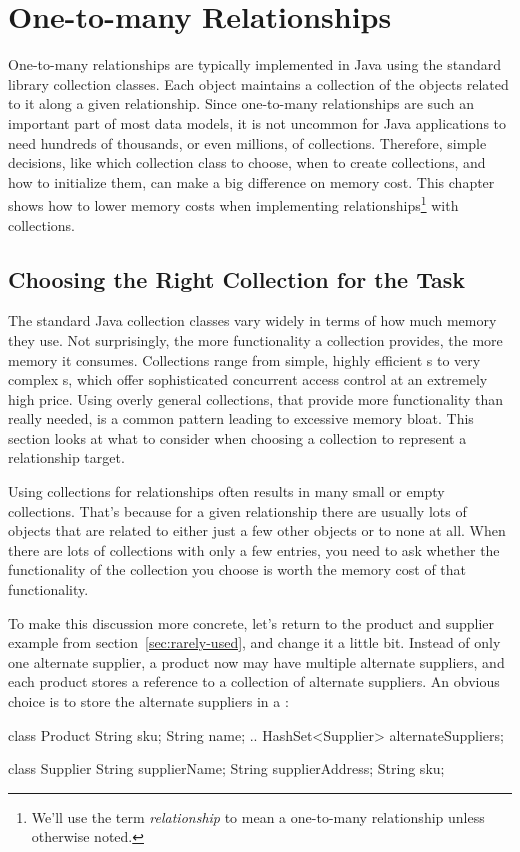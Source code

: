 \chapter{One-to-many Relationships}
\label{chapter:representing-relationships}

One-to-many relationships
are typically implemented in Java using the standard library collection classes.
Each object maintains a collection of the objects related to
it along a given relationship. Since one-to-many relationships are such an
important part of most data models, it is not uncommon for Java applications to
need hundreds of thousands, or even millions, of collections.
Therefore, simple decisions, like which collection class to choose,
when to create collections, and how to initialize them,
can make a big difference on memory cost.
This chapter shows how to lower memory costs when implementing
relationships\footnote{We'll use the term \emph{relationship} to
mean a one-to-many relationship unless otherwise noted.} with collections.
 
 \section{Choosing the Right Collection for the Task}
 \label{section:choosing-collection}

The standard Java collection classes vary widely in terms of how much memory they use.
Not surprisingly, the more functionality a collection provides, the more
memory it consumes. Collections range from simple, highly efficient
s to very complex
s, which offer sophisticated concurrent access
control at an extremely high price. 
Using overly general collections, that provide more functionality than
really needed, is a common pattern leading to excessive memory bloat.
This section looks at what to consider when choosing a collection to
represent a relationship target. 

Using collections for relationships often results in many small or
empty collections.  That's because for a given relationship there are
usually lots of objects that are related to either just a few other
objects or to none at all.
When there are lots of collections with only a few entries, you need to ask  whether
the functionality of the collection you choose is worth the memory cost of that
functionality.

To make this discussion more concrete, let's return to the product and supplier example 
from section~\ref{sec:rarely-used}, and change it a little
 bit. Instead of only one alternate supplier, a product now may have multiple
 alternate suppliers, and each product stores a reference to a collection of alternate suppliers. An obvious choice is
 to store the alternate suppliers in a :
 \begin{shortlisting} 
class Product {
	String sku;
	String name;
	.. 
	HashSet<Supplier> alternateSuppliers;
}

class Supplier {
	String supplierName;
	String supplierAddress;
	String sku;
}
\end{shortlisting}



